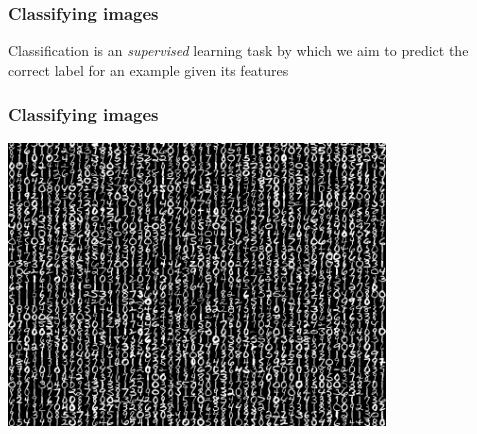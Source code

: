 \begin{frame}
  \frametitle{Classifying images}

  \begin{center}
    Classification is an \textit{supervised} learning task by which we
    aim to predict the correct label for an example given its features
    \vskip20pt



  \end{center}

\end{frame}


\begin{frame}
  \frametitle{Classifying images}

  \begin{center}
    \includegraphics[width=0.75\textwidth]{../../code/image_data/sample_digits.png}
  \end{center}

\end{frame}
